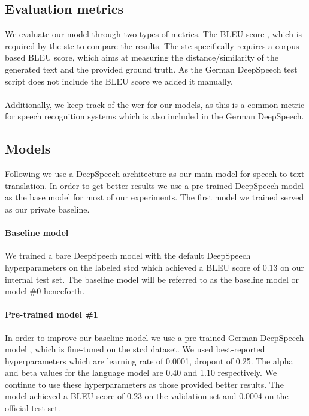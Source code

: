 \subsection{Evaluation metrics}
We evaluate our model through two types of metrics. The BLEU score \cite{Papineni2002BleuAM}, which is required by the \gls{stc} to compare the results. The \gls{stc} specifically requires a corpus-based BLEU score, which aims at measuring the distance/similarity of the generated text and the provided ground truth. As the German DeepSpeech test script does not include the BLEU score we added it manually. \\~\\Additionally, we keep track of the \gls{wer} for our models, as
this is a common metric for speech recognition systems \cite{Park2008AnEA} which is also included in the German DeepSpeech.


\subsection{Models}
Following  we use a DeepSpeech architecture \cite{Hannun2014DeepSS} as our main model for speech-to-text translation. In order to get better results we use a
pre-trained DeepSpeech model \cite{DeepSpeechGerman090} as the base model for most of our experiments. The first model we trained served as our private baseline. \paragraph{Baseline model} We trained a bare DeepSpeech model with the default DeepSpeech hyperparameters on the labeled \gls{stcd} which achieved a BLEU score of 0.13 on our internal test set. The baseline model will be referred to as the baseline model or model \#0 henceforth.
\paragraph{Pre-trained model \#1} In order to improve our baseline model we use a pre-trained
German DeepSpeech model \cite{DeepSpeechGerman090}, which is fine-tuned on the \gls{stcd} dataset. We used \citet{Agarwal2020LTLUDEAL} best-reported hyperparameters which are learning rate of 0.0001, dropout of 0.25. The alpha and beta values for the language model are 0.40 and 1.10 respectively. We continue to use these hyperparameters as those provided better results. The model achieved a BLEU score of
0.23 on the validation set and 0.0004 on the official test set.
